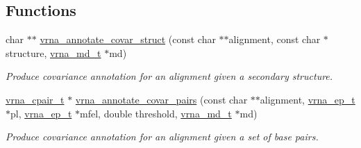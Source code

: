 \subsection*{Functions}
\begin{DoxyCompactItemize}
\item 
\mbox{\label{group__annotation__utils_gae0305bbf95eddd4a57648a1e4739a7f3}} 
char $\ast$$\ast$ \hyperlink{group__annotation__utils_gae0305bbf95eddd4a57648a1e4739a7f3}{vrna\+\_\+annotate\+\_\+covar\+\_\+struct} (const char $\ast$$\ast$alignment, const char $\ast$structure, \hyperlink{group__model__details_ga1f8a10e12a0a1915f2a4eff0b28ea17c}{vrna\+\_\+md\+\_\+t} $\ast$md)
\begin{DoxyCompactList}\small\item\em Produce covariance annotation for an alignment given a secondary structure. \end{DoxyCompactList}\item 
\mbox{\label{group__annotation__utils_gadb9ba32197f05d5876d389b2ba92edac}} 
\hyperlink{group__data__structures_gae4fc91141cc69c6d8eaf1332cb991ecc}{vrna\+\_\+cpair\+\_\+t} $\ast$ \hyperlink{group__annotation__utils_gadb9ba32197f05d5876d389b2ba92edac}{vrna\+\_\+annotate\+\_\+covar\+\_\+pairs} (const char $\ast$$\ast$alignment, \hyperlink{group__struct__utils__plist_gab9ac98ab55ded9fb90043b024b915aca}{vrna\+\_\+ep\+\_\+t} $\ast$pl, \hyperlink{group__struct__utils__plist_gab9ac98ab55ded9fb90043b024b915aca}{vrna\+\_\+ep\+\_\+t} $\ast$mfel, double threshold, \hyperlink{group__model__details_ga1f8a10e12a0a1915f2a4eff0b28ea17c}{vrna\+\_\+md\+\_\+t} $\ast$md)
\begin{DoxyCompactList}\small\item\em Produce covariance annotation for an alignment given a set of base pairs. \end{DoxyCompactList}\end{DoxyCompactItemize}
